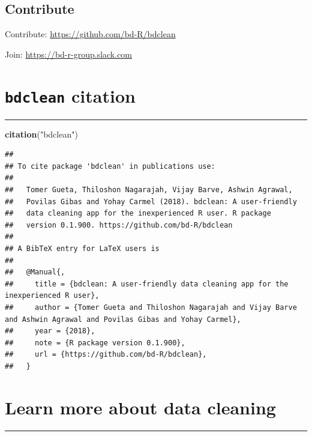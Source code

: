 \documentclass[]{book}
\newenvironment{Shaded}{\begin{snugshade}}{\end{snugshade}}
\newcommand{\KeywordTok}[1]{\textcolor[rgb]{0.13,0.29,0.53}{\textbf{#1}}}
\newcommand{\StringTok}[1]{\textcolor[rgb]{0.31,0.60,0.02}{#1}}
\newcommand{\NormalTok}[1]{#1}
\begin{document}
\section{Contribute}\label{contribute}

Contribute: \url{https://github.com/bd-R/bdclean}

Join: \url{https://bd-r-group.slack.com}

\chapter{\texorpdfstring{\texttt{bdclean}
citation}{bdclean citation}}\label{bdclean-citation}

\begin{center}\rule{0.5\linewidth}{\linethickness}\end{center}

\begin{Shaded}
\begin{Highlighting}[]
\KeywordTok{citation}\NormalTok{(}\StringTok{"bdclean"}\NormalTok{)}
\end{Highlighting}
\end{Shaded}

\begin{verbatim}
## 
## To cite package 'bdclean' in publications use:
## 
##   Tomer Gueta, Thiloshon Nagarajah, Vijay Barve, Ashwin Agrawal,
##   Povilas Gibas and Yohay Carmel (2018). bdclean: A user-friendly
##   data cleaning app for the inexperienced R user. R package
##   version 0.1.900. https://github.com/bd-R/bdclean
## 
## A BibTeX entry for LaTeX users is
## 
##   @Manual{,
##     title = {bdclean: A user-friendly data cleaning app for the inexperienced R user},
##     author = {Tomer Gueta and Thiloshon Nagarajah and Vijay Barve and Ashwin Agrawal and Povilas Gibas and Yohay Carmel},
##     year = {2018},
##     note = {R package version 0.1.900},
##     url = {https://github.com/bd-R/bdclean},
##   }
\end{verbatim}

\chapter{Learn more about data
cleaning}\label{learn-more-about-data-cleaning}

\begin{center}\rule{0.5\linewidth}{\linethickness}\end{center}
\end{document}
